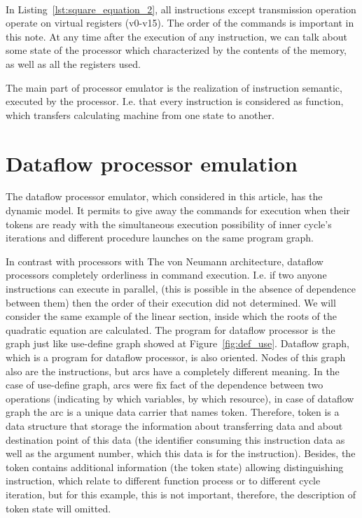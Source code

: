 \documentclass[
11pt,%
tightenlines,%
twoside,%
onecolumn,%
nofloats,%
nobibnotes,%
nofootinbib,%
superscriptaddress,%
noshowpacs,%
centertags]%
{revtex4}
\begin{document}
\

In Listing~\ref{lst:square_equation_2}, all instructions except transmission operation operate on virtual registers (v0-v15). The order of the commands is important in this note. At any time after the execution of any instruction, we can talk about some state of the processor which characterized by the contents of the memory, as well as all the registers used.

The main part of processor emulator is the realization of instruction semantic, executed by the processor. I.e. that every instruction is considered as function, which transfers calculating machine from one state to another.

\section{Dataflow processor emulation}

The dataflow processor emulator, which considered in this article, has the dynamic model. It permits to give away the commands for execution when their tokens are ready with the simultaneous execution possibility of inner cycle’s iterations and different procedure launches on the same program graph.

In contrast with processors with The von Neumann architecture, dataflow processors completely orderliness in command execution. I.e. if two anyone instructions can execute in parallel, (this is possible in the absence of dependence between them) then the order of their execution did not determined. We will consider the same example of the linear section, inside which the roots of the quadratic equation are calculated. The program for dataflow processor is the graph just like use-define graph showed at Figure~\ref{fig:def_use}.
Dataflow graph, which is a program for dataflow processor, is also oriented. Nodes of this graph also are the instructions, but arcs have a completely different meaning. In the case of use-define graph, arcs were fix fact of the dependence between two operations (indicating by which variables, by which resource), in case of dataflow graph the arc is a unique data carrier that names token. Therefore, token is a data structure that storage the information about transferring data and about destination point of this data (the identifier consuming this instruction data as well as the argument number, which this data is for the instruction). Besides, the token contains additional information (the token state) allowing distinguishing instruction, which relate to different function process or to different cycle iteration, but for this example, this is not important, therefore, the description of token state will omitted.
\end{document}
